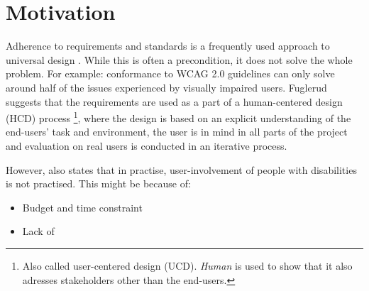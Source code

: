 
\section{Motivation}
Adherence to requirements and standards is a frequently used approach to universal design \parencite{fuglerud_link_2013}. While this is often a precondition, it does not solve the whole problem. For example: conformance to WCAG 2.0 guidelines can only solve around half of the issues experienced by visually impaired users. Fuglerud suggests that the requirements are used as a part of a human-centered design (HCD) process \footnote{Also called user-centered design (UCD). \textit{Human} is used to show that it also adresses stakeholders other than the end-users.}, where the design is based on an explicit understanding of the end-users' task and environment, the user is in mind in all parts of the project and evaluation on real users is conducted in an iterative process.


However, \textcite{fuglerud_link_2013} also states that in practise, user-involvement of people with disabilities is not practised. This might be because of:
\begin{itemize}
    \item Budget and time constraint
    \item Lack of 
\end{itemize}





